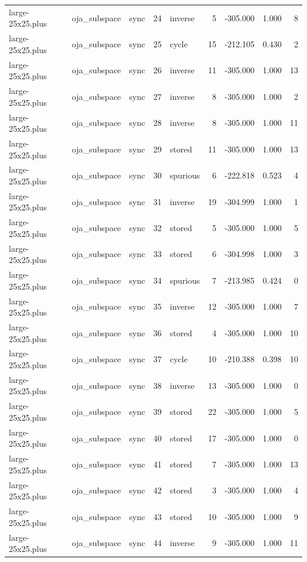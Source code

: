 \begin{tabular}{lllrlrrrr}
large-25x25.plus & oja\_subspace & sync & 24 & inverse & 5 & -305.000 & 1.000 & 8 \\
large-25x25.plus & oja\_subspace & sync & 25 & cycle & 15 & -212.105 & 0.430 & 2 \\
large-25x25.plus & oja\_subspace & sync & 26 & inverse & 11 & -305.000 & 1.000 & 13 \\
large-25x25.plus & oja\_subspace & sync & 27 & inverse & 8 & -305.000 & 1.000 & 2 \\
large-25x25.plus & oja\_subspace & sync & 28 & inverse & 8 & -305.000 & 1.000 & 11 \\
large-25x25.plus & oja\_subspace & sync & 29 & stored & 11 & -305.000 & 1.000 & 13 \\
large-25x25.plus & oja\_subspace & sync & 30 & spurious & 6 & -222.818 & 0.523 & 4 \\
large-25x25.plus & oja\_subspace & sync & 31 & inverse & 19 & -304.999 & 1.000 & 1 \\
large-25x25.plus & oja\_subspace & sync & 32 & stored & 5 & -305.000 & 1.000 & 5 \\
large-25x25.plus & oja\_subspace & sync & 33 & stored & 6 & -304.998 & 1.000 & 3 \\
large-25x25.plus & oja\_subspace & sync & 34 & spurious & 7 & -213.985 & 0.424 & 0 \\
large-25x25.plus & oja\_subspace & sync & 35 & inverse & 12 & -305.000 & 1.000 & 7 \\
large-25x25.plus & oja\_subspace & sync & 36 & stored & 4 & -305.000 & 1.000 & 10 \\
large-25x25.plus & oja\_subspace & sync & 37 & cycle & 10 & -210.388 & 0.398 & 10 \\
large-25x25.plus & oja\_subspace & sync & 38 & inverse & 13 & -305.000 & 1.000 & 0 \\
large-25x25.plus & oja\_subspace & sync & 39 & stored & 22 & -305.000 & 1.000 & 5 \\
large-25x25.plus & oja\_subspace & sync & 40 & stored & 17 & -305.000 & 1.000 & 0 \\
large-25x25.plus & oja\_subspace & sync & 41 & stored & 7 & -305.000 & 1.000 & 13 \\
large-25x25.plus & oja\_subspace & sync & 42 & stored & 3 & -305.000 & 1.000 & 4 \\
large-25x25.plus & oja\_subspace & sync & 43 & stored & 10 & -305.000 & 1.000 & 9 \\
large-25x25.plus & oja\_subspace & sync & 44 & inverse & 9 & -305.000 & 1.000 & 11 \\

\end{tabular}
